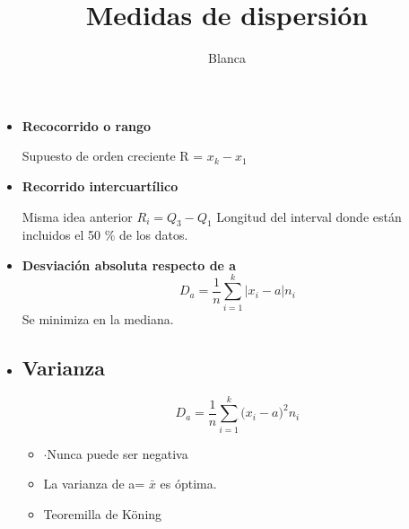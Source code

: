 \ifdefined\COMPLETE

\begin{itemize}
	\item \textbf{Recocorrido o rango}
	\par Supuesto de orden creciente R = $ x_k - x_1$
	\item \textbf{Recorrido intercuartílico }
	\par Misma idea anterior $R_i = Q_3 - Q_1$ Longitud del interval donde están incluidos el 50 \% de los datos. 
	\item \textbf{Desviación absoluta respecto de a }
	$$ D_a = \frac{1}{n} \sum_{i=1}^{k} | x_i - a| n_i$$
	Se minimiza en la mediana.
	
	\item \subsection*{Varianza} 
	$$ D_a = \frac{1}{n} \sum_{i=1}^{k} \big( x_i - a \big)^2 n_i$$
	\begin{itemize}
		\item {$\cdot$}Nunca puede ser negativa
		\item La varianza de a= $\bar{x}$ es óptima. 
		\item Teoremilla de Köning 
	\end{itemize}
	
	
\end{itemize}


\else 
\def\COMPLETE{}

\documentclass[a4paper , 11pt, spanish ]{article}
\usepackage{paquetes}
\title {Medidas de dispersión}
\author{Blanca}



\maketitle 



\fi
